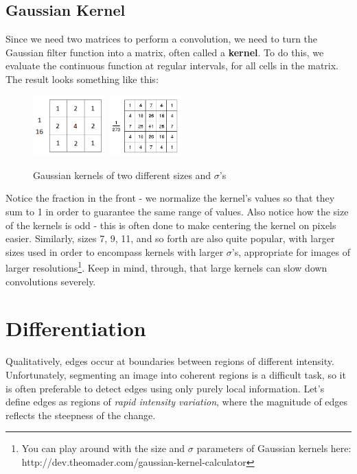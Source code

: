 \documentclass{article}
\begin{document}
\subsection{Gaussian Kernel}
Since we need two matrices to perform a convolution, we need to turn the Gaussian filter function into a matrix, often called a \textbf{kernel}. To do this, we evaluate the continuous function at regular intervals, for all cells in the matrix. The result looks something like this:
\begin{figure}[!htb]
    \begin{center}
        \includegraphics[width=0.25\textwidth]{gaussian3.png}
        \hspace{25pt}
        \includegraphics[width=0.25\textwidth]{gaussian5.png}
    \end{center}
    \vspace{-10pt}
    \caption{Gaussian kernels of two different sizes and $\sigma$'s}
\end{figure}
Notice the fraction in the front - we normalize the kernel's values so that they sum to 1 in order to guarantee the same range of values. Also notice how the size of the kernels is odd - this is often done to make centering the kernel on pixels easier. Similarly, sizes 7, 9, 11, and so forth are also quite popular, with larger sizes used in order to encompass kernels with larger $\sigma$'s, appropriate for images of larger resolutions\footnote{You can play around with the size and $\sigma$ parameters of Gaussian kernels here: http://dev.theomader.com/gaussian-kernel-calculator}. Keep in mind, through, that large kernels can slow down convolutions severely.

\section{Differentiation}
Qualitatively, edges occur at boundaries between regions of different intensity. Unfortunately, segmenting an image into coherent regions is a difficult task, so it is often preferable to detect edges using only purely local information. Let's define edges as regions of \textit{rapid intensity variation}, where the magnitude of edges reflects the steepness of the change.
\end{document}
